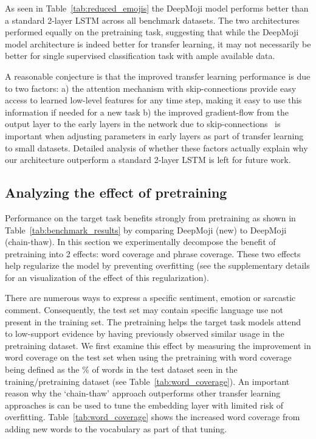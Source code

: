 \documentclass[11pt,a4paper]{article}
\begin{document}
As seen in Table~\ref{tab:reduced_emojis} the DeepMoji model performs better than a standard 2-layer LSTM across all benchmark datasets. The two architectures performed equally on the pretraining task, suggesting that while the DeepMoji model architecture is indeed better for transfer learning, it may not necessarily be better for single supervised classification task with ample available data.

A reasonable conjecture is that the improved transfer learning performance is due to two factors: a) the attention mechanism with skip-connections provide easy access to learned low-level features for any time step, making it easy to use this information if needed for a new task b) the improved gradient-flow from the output layer to the early layers in the network due to skip-connections~\cite{graves2013generating} is important when adjusting parameters in early layers as part of transfer learning to small datasets. Detailed analysis of whether these factors actually explain why our architecture outperform a standard 2-layer LSTM is left for future work.

\subsection{Analyzing the effect of pretraining}
\label{sub_sec:understanding_pretraining}

Performance on the target task benefits strongly from pretraining as shown in Table~\ref{tab:benchmark_results} by comparing DeepMoji (new) to DeepMoji (chain-thaw). In this section we  experimentally decompose the benefit of pretraining into 2 effects: word coverage and phrase coverage. These two effects help regularize the model by preventing overfitting (see the supplementary details for an visualization of the effect of this regularization).

There are numerous ways to express a specific sentiment, emotion or sarcastic comment. Consequently, the test set may contain specific language use not present in the training set. The pretraining helps the target task models attend to low-support evidence by having previously observed similar usage in the pretraining dataset. We first examine this effect by measuring the improvement in word coverage on the test set when using the pretraining with word coverage being defined as the \% of words in the test dataset seen in the training/pretraining dataset (see Table~\ref{tab:word_coverage}). An important reason why the `chain-thaw' approach outperforms other transfer learning approaches is can be used to tune the embedding layer with limited risk of overfitting. Table~\ref{tab:word_coverage} shows the increased word coverage from adding new words to the vocabulary as part of that tuning.
\end{document}
